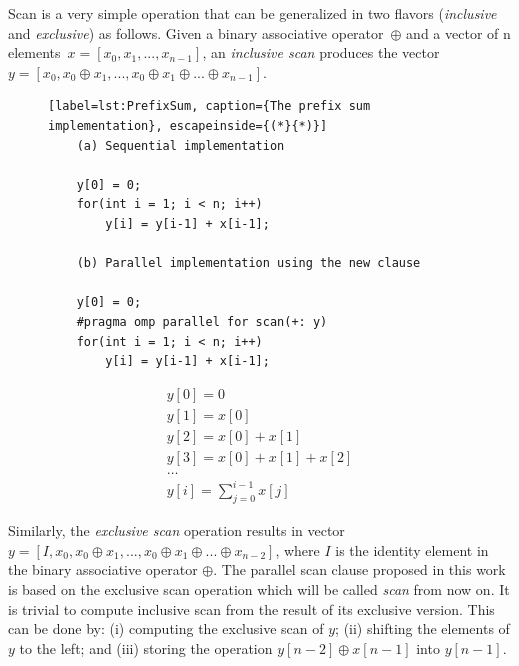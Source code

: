 \documentclass[Ingles]{ic-tese-v1}
\begin{document}
Scan  is a very simple  operation  that can  be generalized
in two flavors (\textit{inclusive} and \textit{exclusive}) as follows.
Given  a binary  associative  operator\  $\oplus$ and  a
vector of  n elements\ $x = [x_{0},  x_{1}, ...  ,x_{n-1}]$,
an   {\em    inclusive   scan}    produces   the    vector
$y =  [ x_{0}, x_{0}  \oplus x_{1},  ... ,x_{0} \oplus  x_{1} \oplus
... \oplus x_{n-1}]$.

\begin{figure}[t]
	\lstset{basicstyle=\scriptsize}
	\begin{lstlisting}[label=lst:PrefixSum, caption={The prefix sum implementation}, escapeinside={(*}{*)}]
	(a) Sequential implementation

	y[0] = 0;
	for(int i = 1; i < n; i++)
		y[i] = y[i-1] + x[i-1];

	(b) Parallel implementation using the new clause

	y[0] = 0;
	#pragma omp parallel for scan(+: y)
	for(int i = 1; i < n; i++)
		y[i] = y[i-1] + x[i-1];
	\end{lstlisting}
	\vspace{-0.7cm}
\end{figure}

\begin{eqnarray}
y[0] = 0\nonumber\\
y[1] = x[0] \nonumber\\
y[2] = x[0] + x[1] \nonumber\\
y[3] = x[0] + x[1] + x[2] \nonumber\\
\dots\nonumber\\
y[i] = \sum_{j=0}^{i-1} x[j]
\label{eq:scan}
\end{eqnarray}

Similarly,  the  {\em  exclusive  scan} operation  results  in  vector
$y =  [ I, x_{0}, x_{0}  \oplus x_{1}, ... ,x_{0}  \oplus x_{1} \oplus
... \oplus x_{n-2}]$, where $I$ is  the identity element in the binary
associative operator  $\oplus$. The  parallel scan clause  proposed in
this work  is based  on the  exclusive scan  operation which  will be
called \textit{scan} from now on.   It is trivial to compute inclusive
scan from  the result of its  exclusive version. This can  be done by:
(i) computing the exclusive scan of $y$; (ii) shifting the elements of
$y$    to    the   left;    and    (iii)    storing   the    operation
$y[n-2] \oplus x[n-1]$ into $y[n-1]$.
\end{document}
